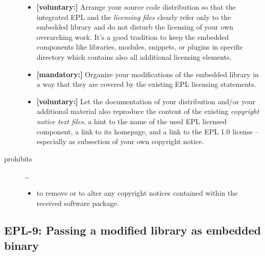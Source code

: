 \begin{description}
\begin{itemize}
  \item \textbf{[voluntary:]} Arrange your source code distribution so that the
  integrated EPL and the \emph{licensing files} clearly refer only to the
  embedded library and do not disturb the licensing of your own overarching
  work. It's a good tradition to keep the embedded components like libraries,
  modules, snippets, or plugins in specific directory which contains also all
  additional licensing elements.
  
  \item \textbf{[mandatory:]} Organize your modifications of the embedded
  library in a way that they are covered by the existing EPL licensing
  statements. 
  
  \item \textbf{[voluntary:]} Let the documentation of your distribution and/or
  your additional material also reproduce the content of the existing
  \emph{copyright notice text files}, a hint to the name of the used EPL
  licensed component, a link to its homepage, and a link to the EPL 1.0 license
  -- especially as subsection of your own copyright notice.
 
\end{itemize}

\item[prohibits] \ldots
\begin{itemize}
  \item to remove or to alter any copyright notices contained within the
  received software package.
\end{itemize}

\end{description}


\subsection{EPL-9: Passing a modified library as embedded binary}
\label{OSUC-10B-EPL}

